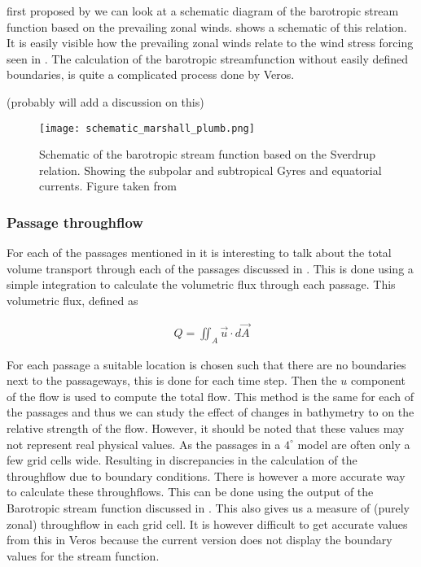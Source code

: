  first proposed by \cite{sverdrup1947wind} we can look at a schematic diagram of the barotropic stream function based on the prevailing zonal winds.  shows a schematic of this relation. It is easily visible how the prevailing zonal winds relate to the wind stress forcing seen in . The calculation of the barotropic streamfunction without easily defined boundaries, is quite a complicated process done by Veros. 
 
 
 (probably will add a discussion on this)
 
  \begin{figure}[H]
 	\texttt{[image: schematic\_marshall\_plumb.png]}
 	\caption{Schematic of the barotropic stream function based on the Sverdrup relation. Showing the subpolar and subtropical Gyres and equatorial currents. Figure taken from \cite{MarschallPlumb}}
 	\label{fig:schem_currents}
 \end{figure}
\subsubsection{Passage throughflow}\label{sec:throughflowp}
For each of the passages mentioned in  it is interesting to talk about the total volume transport through each of the passages discussed in . This is done using a simple integration to calculate the volumetric flux through each passage. This volumetric flux, defined as

\begin{align}
Q = \iint_A \vec{u} \cdot d\vec{A}
\end{align}	

For each passage a suitable location is chosen such that there are no boundaries next to the passageways, this is done for each time step. Then the $u$ component of the flow is used to compute the total flow. This method is the same for each of the passages and thus we can study the effect of changes in bathymetry to on the relative strength of the flow. However, it should be noted that these values may not represent real physical values. As the passages in a $4^{\circ}$ model are often only a few grid cells wide. Resulting in discrepancies in the calculation of the throughflow due to boundary conditions. 
There is however a more accurate way to calculate these throughflows. This can be done using the output of the Barotropic stream function discussed in . This also gives us a measure of (purely zonal) throughflow in each grid cell. It is however difficult to get accurate values from this in Veros because the current version does not display the boundary values for the stream function.

